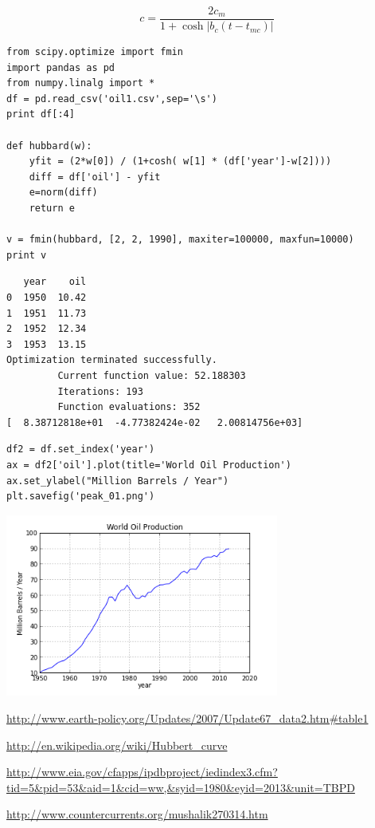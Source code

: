 \documentclass[12pt,fleqn]{article}\usepackage{../common}
\begin{document}
$$ 
c = \frac{ 2c_m}{1 + \cosh |b_c(t-t_{mc})|   }
$$


\begin{verbatim}
from scipy.optimize import fmin
import pandas as pd
from numpy.linalg import *
df = pd.read_csv('oil1.csv',sep='\s')
print df[:4]

def hubbard(w):
    yfit = (2*w[0]) / (1+cosh( w[1] * (df['year']-w[2])))
    diff = df['oil'] - yfit
    e=norm(diff)
    return e

v = fmin(hubbard, [2, 2, 1990], maxiter=100000, maxfun=10000)
print v
\end{verbatim}

\begin{verbatim}
   year    oil
0  1950  10.42
1  1951  11.73
2  1952  12.34
3  1953  13.15
Optimization terminated successfully.
         Current function value: 52.188303
         Iterations: 193
         Function evaluations: 352
[  8.38712818e+01  -4.77382424e-02   2.00814756e+03]
\end{verbatim}

\begin{verbatim}
df2 = df.set_index('year')
ax = df2['oil'].plot(title='World Oil Production')
ax.set_ylabel("Million Barrels / Year")
plt.savefig('peak_01.png')
\end{verbatim}




\includegraphics[height=6cm]{peak_01.png}

\url{http://www.earth-policy.org/Updates/2007/Update67_data2.htm#table1}

\url{http://en.wikipedia.org/wiki/Hubbert_curve}

\url{http://www.eia.gov/cfapps/ipdbproject/iedindex3.cfm?tid=5&pid=53&aid=1&cid=ww,&syid=1980&eyid=2013&unit=TBPD}

\url{http://www.countercurrents.org/mushalik270314.htm}
\end{document}
